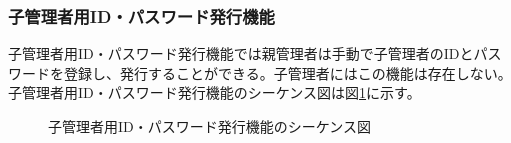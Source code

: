 \documentclass[a4j]{jarticle}
\begin{document}
  \subsubsection{子管理者用ID・パスワード発行機能}
  子管理者用ID・パスワード発行機能では親管理者は手動で子管理者のIDとパスワードを登録し、発行することができる。子管理者にはこの機能は存在しない。子管理者用ID・パスワード発行機能のシーケンス図は図\ref{fig:admin_children_id-pass.png}に示す。
  \begin{figure}[H]
    \centering
    \caption{子管理者用ID・パスワード発行機能のシーケンス図}
    \label{fig:admin_children_id-pass.png}
  \end{figure}
\end{document}
